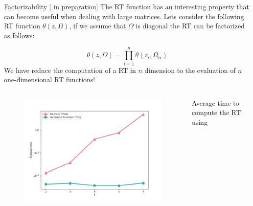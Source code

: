 \documentclass[10pt]{beamer}
\begin{document}


\begin{frame}{Factorizability \hfill \small [\cite{new} in preparation]}
    The RT function has an interesting property that can become useful when dealing with large matrices.
    Lets consider the following RT function $\theta(z, \Omega)$, if we assume that $\Omega$ 
    is diagonal the RT can be factorized as follows:

    \begin{equation}
        \theta(z, \Omega) = \prod_{i=1}^n \theta(z_i, \Omega_{ii})
    \end{equation}
    We have reduce the computation of a RT in $n$ dimension to the evaluation of $n$ one-dimensional
        RT functions!
    \vspace{-1.3    cm}
    \begin{columns}
        \begin{column}{0.7 \textwidth}
            \begin{figure}
                \begin{center}
                    \includegraphics[scale=0.5]{figures/factorized.png}
                \end{center}
            \end{figure}
        \end{column}
        \begin{column}{0.3 \textwidth}
            Average time to compute the RT using \cite{deconinck2002computing}
            

\end{column}
\end{columns}
\end{frame}
\end{document}
